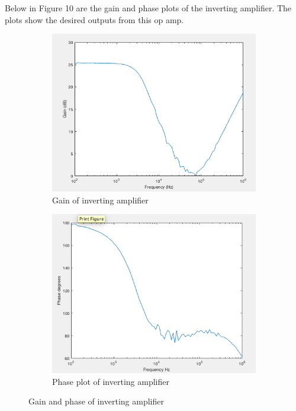  Below in Figure 10 are the gain and phase plots of the inverting amplifier. The plots show the desired outputs from this op amp.
		\begin{figure}[H]
		\centering
			\begin{subfigure}[b]{0.45\textwidth}
				\centering
				\includegraphics[scale=.40]{ExperimentalImplementation/invertingain.png}
				\caption{Gain of inverting amplifier}
				\label{fig:invertinggain}
			\end{subfigure}
		\hfill
			\begin{subfigure}[b]{0.45\textwidth}
				\centering
				\includegraphics[scale=.40]{ExperimentalImplementation/invertingphase.png}
				\caption{Phase plot of inverting amplifier}
				\label{fig:invertingphase}
			\end{subfigure}
		\caption{Gain and phase of inverting amplifier}
		\label{fig:invertamp}
		\end{figure} 
